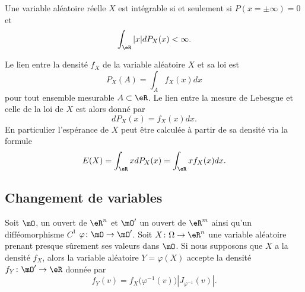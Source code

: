 \begin{proposition}
    Une variable aléatoire réelle \( X\) est intégrable si et seulement si \( P(x=\pm\infty)=0\) et
    \begin{equation}
        \int_{\eR}| x |dP_X(x)<\infty.
    \end{equation}
\end{proposition}

Le lien entre la densité \( f_X\) de la variable aléatoire \( X\) et sa loi est
\begin{equation}
    P_X(A)=\int_Af_X(x)dx
\end{equation}
pour tout ensemble mesurable \( A\subset\eR\). Le lien entre la mesure de Lebesgue et celle de la loi de \( X\) est alors donné par
\begin{equation}
    dP_X(x)=f_X(x)dx.
\end{equation}
En particulier l'espérance de \( X\) peut être calculée à partir de sa densité via la formule
\begin{equation}        \label{EqEspDensform}
    E(X)=\int_{\eR}xdP_X(x)=\int_{\eR}x f_X(x)dx.
\end{equation}

\subsection{Changement de variables}

\begin{theorem}
    Soit \( \mO\), un ouvert de \( \eR^n\) et \( \mO'\) un ouvert de \( \eR^m\) ainsi qu'un difféomorphisme \( C^1\) \( \varphi\colon \mO\to \mO'\). Soit \( X\colon \Omega\to \eR^n\) une variable aléatoire prenant presque sûrement ses valeurs dans \( \mO\). Si nous supposons que \( X\) a la densité \( f_X\), alors la variable aléatoire \( Y=\varphi(X)\) accepte la densité \( f_Y\colon \mO'\to \eR\) donnée par
    \begin{equation}
        f_Y(v)=f_X\big( \varphi^{-1}(v) \big)| J_{\varphi^{-1}}(v) |.
    \end{equation}
\end{theorem}

